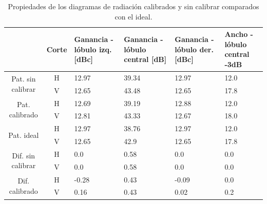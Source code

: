 \begin{table}[H]
  \footnotesize
  \centering
  \begin{tabular}{|c|c|p{2cm}|p{2.5cm}|p{2.5cm}|p{2.5cm}|}
    \cline{2-6}
    \multicolumn{1}{c|}{} & Corte & Ganancia - lóbulo izq. [dBc] & Ganancia - lóbulo central [dB] &
    Ganancia - lóbulo der. [dBc] & Ancho - lóbulo central -3dB \tabularnewline\hline
    \multirow{2}{2cm}{Pat. sin calibrar} & H & 12.97 & 39.34 & 12.97 & 12.0 \tabularnewline\cline{2-6}
     & V & 12.65 & 43.48 & 12.65 & 17.8 \tabularnewline\hline
    \multirow{2}{2cm}{Pat. calibrado} & H & 12.69 & 39.19 & 12.88 & 12.0 \tabularnewline\cline{2-6}
     & V & 12.81 & 43.33 & 12.67 & 18.0 \tabularnewline\hline
    \multirow{2}{2cm}{Pat. ideal} & H & 12.97 & 38.76 & 12.97 & 12.0 \tabularnewline\cline{2-6}
     & V & 12.65 & 42.9 & 12.65 & 17.8 \tabularnewline\hline
    \multirow{2}{2cm}{Dif. sin calibrar} & H & 0.0 & 0.58 & 0.0 & 0.0\tabularnewline\cline{2-6}
     & V & 0.0 & 0.58 & 0.0 & 0.0 \tabularnewline\hline
    \multirow{2}{2cm}{Dif. calibrado} & H & -0.28 & 0.43 & -0.09 & 0.0 \tabularnewline\cline{2-6}
     & V & 0.16 & 0.43 & 0.02 & 0.2 \tabularnewline\hline
  \end{tabular}
  \caption{Propiedades de los diagramas de radiación calibrados y sin calibrar comparados con el ideal.}
  \label{tab:wallErrClassical10degRow}
\end{table}
